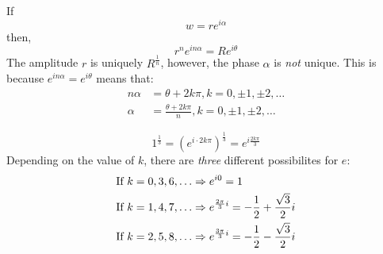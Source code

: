 \documentclass[12pt]{article}
\begin{document}
If
\begin{equation*}
  w = re^{i \alpha}
\end{equation*}
then,
\begin{equation*}
  r^ne^{in \alpha} = Re^{i \theta}
\end{equation*}
The amplitude $r$ is uniquely $R^{\frac{1}{n}}$, however, the phase $\alpha$ is \textit{not} unique. This is because $e^{in \alpha} = e^{i \theta}$ means that:
\begin{align*}
  n \alpha &= \theta + 2k\pi, k=0,\pm1,\pm2,\hdots \\
  \alpha   &= \frac{\theta + 2k\pi}{n}, k=0,\pm1,\pm2,\hdots
\end{align*}
\begin{example}
  \begin{equation*}
    1^{\frac{1}{3}} = \left(e^{i \cdot 2k\pi}\right)^{\frac{1}{3}}  =e^{i \frac{2k\pi}{3}}
  \end{equation*}
  Depending on the value of $k$, there are \textit{three} different possibilites for $e$: \\
  \begin{align*}
    &\textup{If}\ k=0,3,6,\hdots \Rightarrow e^{i0}=1 \\
    &\textup{If}\ k=1,4,7,\hdots \Rightarrow e^{\frac{2\pi}{3}i}=-\frac{1}{2}+\frac{\sqrt{3}}{2}i \\
    &\textup{If}\ k=2,5,8,\hdots \Rightarrow e^{\frac{3\pi}{3}i}=-\frac{1}{2}-\frac{\sqrt{3}}{2}i \\
  \end{align*}
\end{example}
\end{document}
